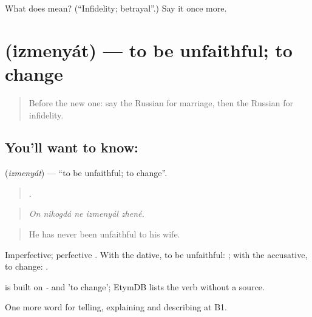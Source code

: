 \begin{tcolorbox}[breakable,colback=teal!4,colframe=teal!35!black,title={Before you move on}]
What does  mean? (\textquotedblleft{}Infidelity; betrayal\textquotedblright{}.) Say it once more.
\end{tcolorbox}
\section[\texorpdfstring{\ru{изменять} (izmenyát)}{изменять (izmenyát)}]{ (izmenyát) — to be unfaithful; to change}

\label{lesson:RU-C494-izmenyat}



\begin{quote}
Before the new one: say the Russian for marriage, then the Russian for infidelity.
\end{quote}

\subsection*{You'll want to know: }
\textbf{} (\emph{izmenyát}) — \textquotedblleft{}to be unfaithful; to change\textquotedblright{}.

\begin{quote}
    .
\end{quote}

\begin{quote}
\emph{On nikogdá ne izmenyál zhené.}
\end{quote}

\begin{quote}
He has never been unfaithful to his wife.
\end{quote}

Imperfective; perfective . With the dative, to be unfaithful: \emph{ }; with the accusative, to change: \emph{ }.

\begin{cousinweb}
\emph{} is built on \emph{-} and \emph{} 'to change'; EtymDB lists the verb without a source.
\end{cousinweb}

\begin{grammarlens}[title={What you've built}]
One more word for telling, explaining and describing at B1.
\end{grammarlens}

